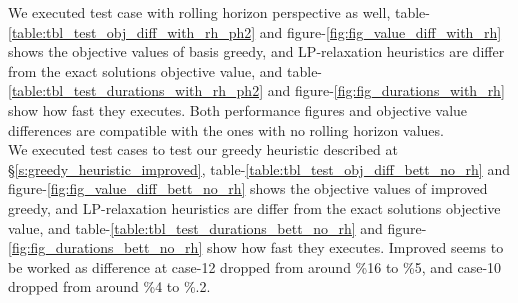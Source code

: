 \documentclass[11pt]{article}
\begin{document}
We executed test case with rolling horizon perspective as well, table-\ref{table:tbl_test_obj_diff_with_rh_ph2} and figure-\ref{fig:fig_value_diff_with_rh} shows the objective values of basis greedy, and LP-relaxation heuristics are differ from the exact solutions objective value, and table-\ref{table:tbl_test_durations_with_rh_ph2} and figure-\ref{fig:fig_durations_with_rh} show how fast they executes. Both performance figures and objective value differences are compatible with the ones with no rolling horizon values.\\

We executed test cases to test our greedy heuristic described at \S \ref{s:greedy_heuristic_improved}, table-\ref{table:tbl_test_obj_diff_bett_no_rh} and figure-\ref{fig:fig_value_diff_bett_no_rh} shows the objective values of improved greedy, and LP-relaxation heuristics are differ from the exact solutions objective value, and table-\ref{table:tbl_test_durations_bett_no_rh} and figure-\ref{fig:fig_durations_bett_no_rh} show how fast they executes. Improved seems to be worked as difference at case-12 dropped from around \%16 to \%5, and case-10 dropped from around \%4 to \%.2.


\end{document}
